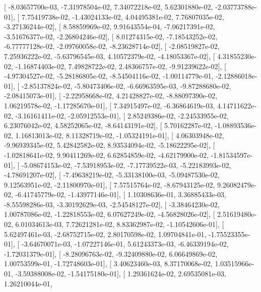 \documentclass{article}
\begin{document}
       [ -8.03657700e-03,  -7.31978504e-02,   7.34072218e-02,
          5.62301880e-02,  -2.03773788e-01],
       [  7.75419738e-02,  -1.43024133e-02,   4.04495381e-02,
          7.76807035e-02,  -3.27136244e-02],
       [  8.58859969e-02,   9.91643554e-04,  -7.06217391e-02,
         -3.51676377e-02,  -2.26804246e-02],
       [  8.01274315e-02,  -7.18543252e-02,  -6.77777128e-02,
         -2.09760058e-02,  -8.23628714e-02],
       [ -2.08519827e-02,   7.25936222e-02,  -5.63796545e-03,
          4.10572379e-02,  -4.18053367e-02],
       [  4.31855230e-02,  -1.16874403e-02,   7.49828722e-02,
          2.48366757e-02,  -9.91239622e-02],
       [ -4.97304527e-02,  -5.28186805e-02,  -8.54504116e-02,
         -1.00114779e-01,  -2.12886018e-01],
       [ -2.85137824e-02,  -5.80473406e-02,  -6.66963595e-03,
         -9.87288680e-02,  -2.08415073e-01],
       [ -2.22958668e-02,   4.21428827e-02,  -8.88097390e-02,
          1.06219578e-02,  -1.17285670e-01],
       [  7.34915497e-02,  -6.36864619e-03,   4.14711622e-02,
         -3.16161411e-02,  -2.05912553e-01],
       [  2.85249386e-02,  -2.24533955e-02,   6.23076042e-02,
          4.58252065e-02,  -8.64143191e-02],
       [  5.70162287e-02,  -1.08893536e-02,   1.16813013e-02,
          8.11328719e-02,  -1.05324191e-01],
       [  4.06303948e-02,  -9.96939345e-02,   5.42842582e-02,
          8.93534094e-02,  -5.18622295e-02],
       [ -1.02818641e-02,   9.90411269e-02,   6.62854859e-02,
         -4.62179900e-02,  -1.81534597e-01],
       [ -5.08674153e-02,  -7.53918953e-02,  -7.17739522e-03,
         -5.22183993e-02,  -4.78691207e-02],
       [ -7.49638219e-02,  -5.33138100e-03,  -5.09487530e-02,
          9.12563951e-02,  -2.11800970e-01],
       [  7.57515764e-02,  -8.67943125e-02,   9.26082479e-02,
         -6.41745779e-02,  -1.43977146e-01],
       [  1.10308636e-01,   3.36885433e-03,  -8.55598286e-03,
         -3.30192629e-03,  -2.54548127e-02],
       [ -3.38464230e-02,   1.00787086e-02,  -1.22818553e-02,
          6.07627249e-02,  -4.56828026e-02],
       [  2.51619480e-02,   6.01034613e-03,   7.72621281e-02,
          8.83362987e-02,  -1.10542606e-01],
       [  5.62497461e-03,  -2.68752715e-02,   2.80170598e-02,
          1.09704841e-01,  -1.75523355e-01],
       [ -3.64670071e-03,  -1.07227146e-01,   5.61243373e-03,
         -6.46339194e-02,  -1.72031379e-01],
       [ -8.28096763e-02,  -9.32409880e-02,   6.06649869e-02,
          1.00753599e-01,  -1.72748603e-01],
       [  3.40623460e-03,   8.37170068e-02,   1.03515966e-01,
         -3.59388008e-02,  -1.54175180e-01],
       [  1.29361624e-02,   2.69535081e-03,   1.26210044e-01,
\end{document}

